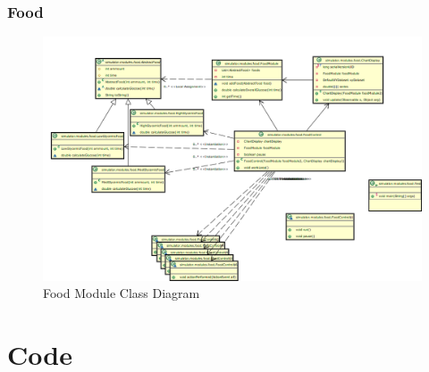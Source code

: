 \documentclass[pdflatex,a4paper,11pt,english]{scrreprt}
\begin{document}
\subsubsection{Food}
\begin{figure}[htb]
\centering
\includegraphics[width=\textwidth]{images/food_module_class_diagram.png}
\caption{Food Module Class Diagram}
\label{fig:food_module_class_diagram}
\end{figure}

\section{Code}



        
\end{document}
